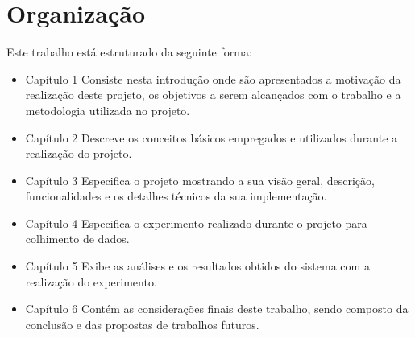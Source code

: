 
\section{Organização} %

 Este trabalho está estruturado da seguinte forma:
 
\begin{itemize}
 \item Capítulo 1
	\subitem Consiste nesta introdução onde são apresentados a motivação da realização deste projeto, os objetivos a serem alcançados com o trabalho e a metodologia utilizada no projeto.
 \item Capítulo 2
	\subitem Descreve os conceitos básicos empregados e utilizados durante a realização do projeto.
 \item Capítulo 3
	\subitem Especifica o projeto mostrando a sua visão geral, descrição, funcionalidades e os detalhes técnicos da sua implementação.
 \item Capítulo 4
	\subitem Especifica o experimento realizado durante o projeto para colhimento de dados.
 \item Capítulo 5
	\subitem Exibe as análises e os resultados obtidos do sistema com a realização do experimento.
 \item Capítulo 6
	\subitem Contém as considerações finais deste trabalho, sendo composto da conclusão e das propostas de trabalhos futuros.
\end{itemize}


